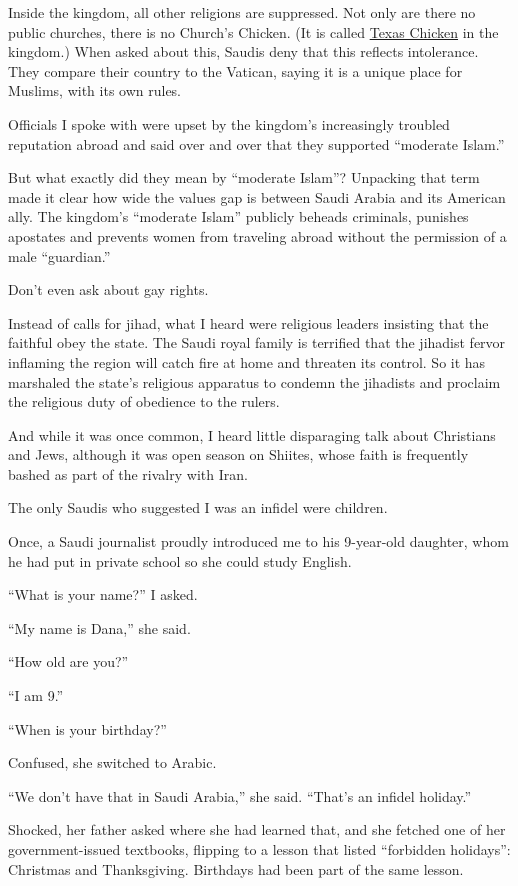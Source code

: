 Inside the kingdom, all other religions are suppressed. Not only are
there no public churches, there is no Church's Chicken. (It is called
\href{http://www.texaschickenme.com/ksa/company/about_texas_chicken_ksa}{Texas
Chicken} in the kingdom.) When asked about this, Saudis deny that this
reflects intolerance. They compare their country to the Vatican, saying
it is a unique place for Muslims, with its own rules.

Officials I spoke with were upset by the kingdom's increasingly troubled
reputation abroad and said over and over that they supported ``moderate
Islam.''

But what exactly did they mean by ``moderate Islam''? Unpacking that
term made it clear how wide the values gap is between Saudi Arabia and
its American ally. The kingdom's ``moderate Islam'' publicly beheads
criminals, punishes apostates and prevents women from traveling abroad
without the permission of a male ``guardian.''

Don't even ask about gay rights.

Instead of calls for jihad, what I heard were religious leaders
insisting that the faithful obey the state. The Saudi royal family is
terrified that the jihadist fervor inflaming the region will catch fire
at home and threaten its control. So it has marshaled the state's
religious apparatus to condemn the jihadists and proclaim the religious
duty of obedience to the rulers.

And while it was once common, I heard little disparaging talk about
Christians and Jews, although it was open season on Shiites, whose faith
is frequently bashed as part of the rivalry with Iran.

The only Saudis who suggested I was an infidel were children.

Once, a Saudi journalist proudly introduced me to his 9-year-old
daughter, whom he had put in private school so she could study English.

``What is your name?'' I asked.

``My name is Dana,'' she said.

``How old are you?''

``I am 9.''

``When is your birthday?''

Confused, she switched to Arabic.

``We don't have that in Saudi Arabia,'' she said. ``That's an infidel
holiday.''

Shocked, her father asked where she had learned that, and she fetched
one of her government-issued textbooks, flipping to a lesson that listed
``forbidden holidays'': Christmas and Thanksgiving. Birthdays had been
part of the same lesson.

